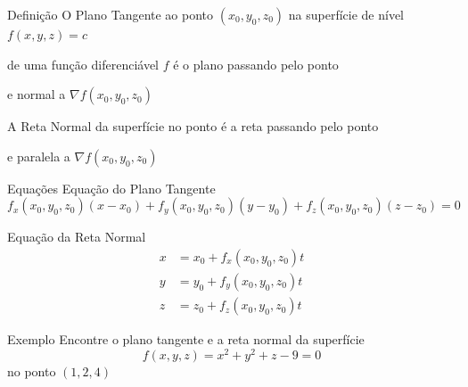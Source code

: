 \begin{frame}{Definição}
  O Plano Tangente ao ponto \((x_0, y_0, z_0)\)
  \pause
  na superfície de nível
  \(f(x, y, z) = c\)

  \pause
  de uma função diferenciável $f$
  \pause
  é o plano passando pelo
  ponto

  \pause
  e normal a \(\nabla f (x_0, y_0, z_0)\)

  \pause
  \vspace{\baselineskip}
  A Reta Normal da superfície no ponto é a reta passando pelo ponto

  \pause
  e paralela
  a \(\nabla f (x_0, y_0, z_0)\)
\end{frame}

\begin{frame}{Equações}
  Equação do Plano Tangente
  \[
    f_x(x_0, y_0, z_0) (x-x_0) +
    f_y(x_0, y_0, z_0) (y-y_0) +
    f_z(x_0, y_0, z_0) (z-z_0) = 0
  \]

  \pause
  Equação da Reta Normal
  \begin{align*}
    x & = x_0 + f_x(x_0, y_0, z_0) t \\
    y & = y_0 + f_y(x_0, y_0, z_0) t \\
    z & = z_0 + f_z(x_0, y_0, z_0) t
  \end{align*}
\end{frame}

\addtocounter{exemplo}{1}
\begin{frame}{Exemplo \theexemplo}
  Encontre o plano tangente e a reta normal da superfície
  \[
    f(x, y, z) = x^2 + y^2 + z - 9 = 0
  \]
  no ponto \((1, 2, 4)\)
\end{frame}

